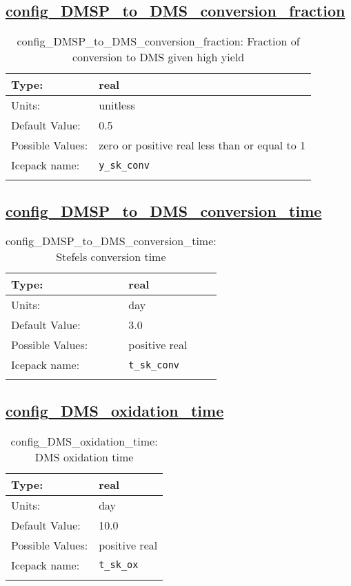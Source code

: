\subsection[config\_DMSP\_to\_DMS\_conversion\_fraction]{\hyperref[sec:nm_tab_biogeochemistry]{config\_DMSP\_to\_DMS\_conversion\_fraction}}
\label{subsec:nm_sec_config_DMSP_to_DMS_conversion_fraction}
\begin{center}
\begin{longtable}{| p{2.0in} || p{4.0in} |}
    \hline
    Type: & real \\
    \hline
    Units: & \si{unitless} \\
    \hline
    Default Value: & 0.5 \\
    \hline
    Possible Values: & zero or positive real less than or equal to 1 \\
    \hline
    \hline
    Icepack name: & \verb+y_sk_conv+ \\
    \caption{config\_DMSP\_to\_DMS\_conversion\_fraction: Fraction of conversion to DMS given high yield}
\end{longtable}
\end{center}
\subsection[config\_DMSP\_to\_DMS\_conversion\_time]{\hyperref[sec:nm_tab_biogeochemistry]{config\_DMSP\_to\_DMS\_conversion\_time}}
\label{subsec:nm_sec_config_DMSP_to_DMS_conversion_time}
\begin{center}
\begin{longtable}{| p{2.0in} || p{4.0in} |}
    \hline
    Type: & real \\
    \hline
    Units: & \si{day} \\
    \hline
    Default Value: & 3.0 \\
    \hline
    Possible Values: & positive real \\
    \hline
    \hline
    Icepack name: & \verb+t_sk_conv+ \\
    \caption{config\_DMSP\_to\_DMS\_conversion\_time: Stefels conversion time}
\end{longtable}
\end{center}
\subsection[config\_DMS\_oxidation\_time]{\hyperref[sec:nm_tab_biogeochemistry]{config\_DMS\_oxidation\_time}}
\label{subsec:nm_sec_config_DMS_oxidation_time}
\begin{center}
\begin{longtable}{| p{2.0in} || p{4.0in} |}
    \hline
    Type: & real \\
    \hline
    Units: & \si{day} \\
    \hline
    Default Value: & 10.0 \\
    \hline
    Possible Values: & positive real \\
    \hline
    \hline
    Icepack name: & \verb+t_sk_ox+ \\
    \caption{config\_DMS\_oxidation\_time: DMS oxidation time}
\end{longtable}
\end{center}
